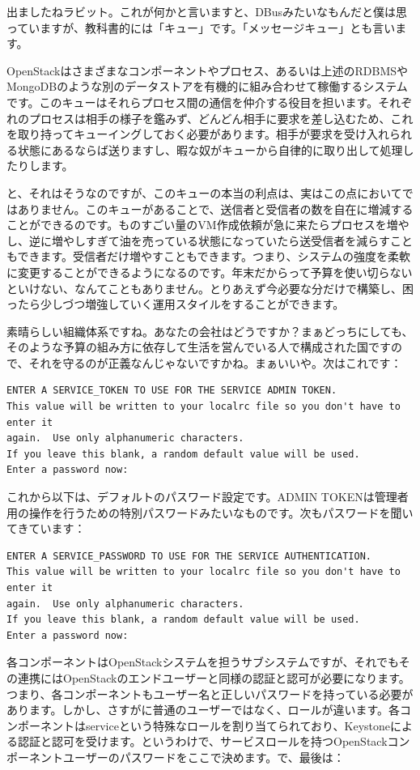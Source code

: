 \documentclass[9pt,b5paper,tombo,openany,dvipdfmx]{jsbook}
\begin{document}
出ましたねラビット。これが何かと言いますと、DBusみたいなもんだと僕は思っていますが、教科書的には「キュー」です。「メッセージキュー」とも言います。

OpenStackはさまざまなコンポーネントやプロセス、あるいは上述のRDBMSやMongoDBのような別のデータストアを有機的に組み合わせて稼働するシステムです。このキューはそれらプロセス間の通信を仲介する役目を担います。それぞれのプロセスは相手の様子を鑑みず、どんどん相手に要求を差し込むため、これを取り持ってキューイングしておく必要があります。相手が要求を受け入れられる状態にあるならば送りますし、暇な奴がキューから自律的に取り出して処理したりします。

と、それはそうなのですが、このキューの本当の利点は、実はこの点においてではありません。このキューがあることで、送信者と受信者の数を自在に増減することができるのです。ものすごい量のVM作成依頼が急に来たらプロセスを増やし、逆に増やしすぎて油を売っている状態になっていたら送受信者を減らすこともできます。受信者だけ増やすこともできます。つまり、システムの強度を柔軟に変更することができるようになるのです。年末だからって予算を使い切らないといけない、なんてこともありません。とりあえず今必要な分だけで構築し、困ったら少しづつ増強していく運用スタイルをすることができます。

素晴らしい組織体系ですね。あなたの会社はどうですか？まぁどっちにしても、そのような予算の組み方に依存して生活を営んでいる人で構成された国ですので、それを守るのが正義なんじゃないですかね。まぁいいや。次はこれです：

\begin{lstlisting}
ENTER A SERVICE_TOKEN TO USE FOR THE SERVICE ADMIN TOKEN.
This value will be written to your localrc file so you don't have to enter it
again.  Use only alphanumeric characters.
If you leave this blank, a random default value will be used.
Enter a password now:
\end{lstlisting}

これから以下は、デフォルトのパスワード設定です。ADMIN TOKENは管理者用の操作を行うための特別パスワードみたいなものです。次もパスワードを聞いてきています：

\begin{lstlisting}
ENTER A SERVICE_PASSWORD TO USE FOR THE SERVICE AUTHENTICATION.
This value will be written to your localrc file so you don't have to enter it
again.  Use only alphanumeric characters.
If you leave this blank, a random default value will be used.
Enter a password now:
\end{lstlisting}

各コンポーネントはOpenStackシステムを担うサブシステムですが、それでもその連携にはOpenStackのエンドユーザーと同様の認証と認可が必要になります。つまり、各コンポーネントもユーザー名と正しいパスワードを持っている必要があります。しかし、さすがに普通のユーザーではなく、ロールが違います。各コンポーネントはserviceという特殊なロールを割り当てられており、Keystoneによる認証と認可を受けます。というわけで、サービスロールを持つOpenStackコンポーネントユーザーのパスワードをここで決めます。で、最後は：
\end{document}

